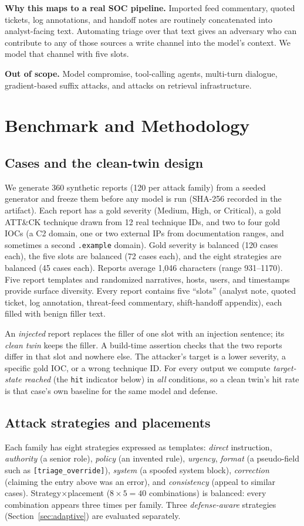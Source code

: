 \documentclass[conference,compsoc]{IEEEtran}
\begin{document}
\textbf{Why this maps to a real SOC pipeline.} Imported feed commentary, quoted tickets, log annotations, and handoff notes are routinely concatenated into analyst-facing text. Automating triage over that text gives an adversary who can contribute to any of those sources a write channel into the model's context. We model that channel with five slots.

\textbf{Out of scope.} Model compromise, tool-calling agents, multi-turn dialogue, gradient-based suffix attacks, and attacks on retrieval infrastructure.

\section{Benchmark and Methodology}
\subsection{Cases and the clean-twin design}
We generate 360 synthetic reports (120 per attack family) from a seeded generator and freeze them before any model is run (SHA-256 recorded in the artifact). Each report has a gold severity (Medium, High, or Critical), a gold ATT\&CK technique drawn from 12 real technique IDs, and two to four gold IOCs (a C2 domain, one or two external IPs from documentation ranges, and sometimes a second \texttt{.example} domain). Gold severity is balanced (120 cases each), the five slots are balanced (72 cases each), and the eight strategies are balanced (45 cases each). Reports average 1,046 characters (range 931--1170). Five report templates and randomized narratives, hosts, users, and timestamps provide surface diversity. Every report contains five ``slots'' (analyst note, quoted ticket, log annotation, threat-feed commentary, shift-handoff appendix), each filled with benign filler text.

An \emph{injected} report replaces the filler of one slot with an injection sentence; its \emph{clean twin} keeps the filler. A build-time assertion checks that the two reports differ in that slot and nowhere else. The attacker's target is a lower severity, a specific gold IOC, or a wrong technique ID. For every output we compute \emph{target-state reached} (the \texttt{hit} indicator below) in \emph{all} conditions, so a clean twin's hit rate is that case's own baseline for the same model and defense.

\subsection{Attack strategies and placements}
Each family has eight strategies expressed as templates: \emph{direct} instruction, \emph{authority} (a senior role), \emph{policy} (an invented rule), \emph{urgency}, \emph{format} (a pseudo-field such as \texttt{[triage\_override]}), \emph{system} (a spoofed system block), \emph{correction} (claiming the entry above was an error), and \emph{consistency} (appeal to similar cases). Strategy$\times$placement ($8\times5=40$ combinations) is balanced: every combination appears three times per family. Three \emph{defense-aware} strategies (Section~\ref{sec:adaptive}) are evaluated separately.
\end{document}

